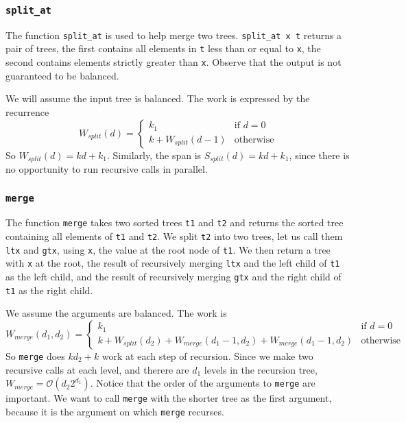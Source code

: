 \documentclass[12pt,letterpaper]{article}
\newcommand{\T}[1]{\texttt{#1}}
\begin{document}
\subsubsection{\T{split\_at}}
The function \T{split\_at} is used to help merge two trees.
\T{split\_at x t} returns a pair of trees, the first contains all elements in \T{t} less than or equal to \T{x}, the second contains elements strictly greater than \T{x}.
Observe that the output is not guaranteed to be balanced.

We will assume the input tree is balanced.
The work is expressed by the recurrence
\[ W_{split}(d) =
  \begin{cases}
    k_1 & \text{if } d=0\\
    k + W_{split}(d-1) & \text{otherwise}
  \end{cases}
\]
So $W_{split}(d) = kd + k_1$.
Similarly, the span is $S_{split}(d) = kd + k_1$, since there is no opportunity to run recursive calls in parallel.


\subsubsection{\T{merge}}
The function \T{merge} takes two sorted trees \T{t1} and \T{t2} and returns the sorted tree containing all elements of \T{t1} and \T{t2}.
We split \T{t2} into two trees, let us call them \T{ltx} and \T{gtx}, using \T{x}, the value at the root node of \T{t1}.
We then return a tree with \T{x} at the root, the result of recursively merging \T{ltx} and the left child of \T{t1} as the left child, and the result of recursively merging \T{gtx} and the right child of \T{t1} as the right child.

We assume the arguments are balanced.
The work is 
\[ W_{merge}(d_1, d_2) =
  \begin{cases}
    k_1 & \text{if } d=0\\
    k + W_{split}(d_2) + W_{merge}(d_1-1,d_2) + W_{merge}(d_1-1,d_2) & \text{otherwise}
  \end{cases}
\]
So \T{merge} does $kd_2 + k$ work at each step of recursion.
Since we make two recursive calls at each level, and therere are $d_1$ levels in the recursion tree,
$W_{merge} = \mathcal{O}(d_2 2^{d_1})$.
Notice that the order of the arguments to \T{merge} are important.
We want to call \T{merge} with the shorter tree as the first argument, because it is the argument on which \T{merge} recurses.
\end{document}
